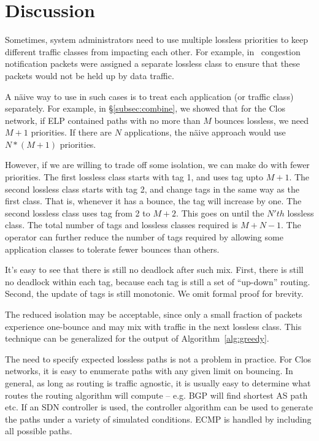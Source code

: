 \section{Discussion}

 Sometimes, system administrators need to
use multiple lossless priorities to keep different traffic classes from
impacting each other. For example, in~\cite{dcqcn} congestion notification
packets were assigned a separate lossless class to ensure that these packets
would not be held up by data traffic.

A n{\"a}ive way to use \sysname{} in such cases is to treat each application (or
traffic class) separately.  For example, in \S\ref{subsec:combine}, we showed
that for the Clos network, if ELP contained paths with no more than $M$
bounces lossless, we need $M+1$ priorities. If there are $N$ applications, the
n{\"a}ive approach would use $N*(M+1)$ priorities. 

However, if we are willing to trade off some isolation, we can make do with
fewer priorities.
The first lossless class starts with tag 1, and uses tag upto $M+1$.
The second lossless class starts with tag 2, and change tags in the same way as
the first class.  That is, whenever it has a bounce, the tag will increase by
one. The second lossless class uses tag from 2 to $M+2$. This goes on until the
$N'th$ lossless class. The total number of tags and lossless classes required is
$M + N -1$. The operator can further reduce the number of tags required by allowing
some application classes to tolerate fewer bounces than others.

It's easy to see that there is still no deadlock after such mix. First, there is
still no deadlock within each tag, because each tag is still a set of
``up-down'' routing. Second, the update of tags is still monotonic. We omit
formal proof for brevity.

The reduced isolation may be acceptable, since only a small fraction of
packets experience one-bounce and may mix with traffic in the next lossless
class.  This technique can be generalized for the output of
Algorithm~\ref{alg:greedy}.

 The need to specify expected lossless paths is not a
problem in practice. For Clos networks, it is easy to enumerate paths with any
given limit on bouncing. In general, as long as routing is traffic agnostic, it
is usually easy to determine what routes the routing algorithm will compute --
e.g. BGP will find shortest AS path etc.  If an SDN controller is used, the
controller algorithm can be used to generate the paths under a variety of
simulated conditions. ECMP is handled by including all possible paths.

